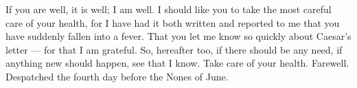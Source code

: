 

If you are well, it is well; I am well. I should like you to take the most careful care of your health, for I have had it both written and reported to me that you have suddenly fallen into a fever. That you let me know so quickly about Caesar's letter --- for that I am grateful. So, hereafter too, if there should be any need, if anything new should happen, see that I know. Take care of your health. Farewell. Despatched the fourth day before the Nones of June.
